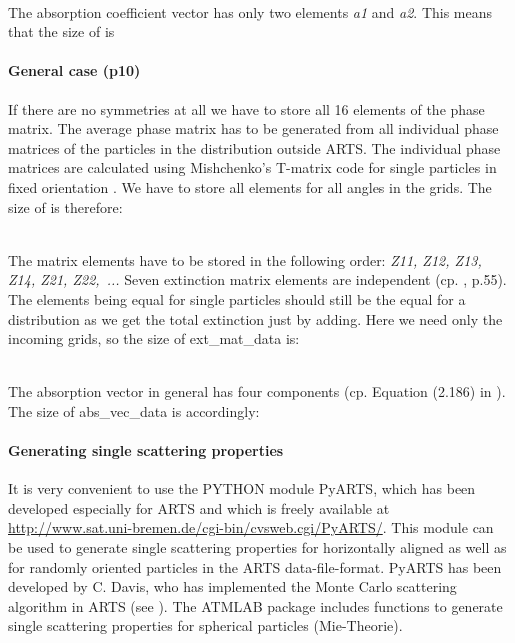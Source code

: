 \artsstyle{[N\_f N\_T N\_za/2+1 1 3]}\\
The absorption coefficient vector has only two elements {\sl a1} and
{\sl a2}. This means that the size of  is 

\artsstyle{[N\_f N\_T N\_za/2+1 1 2]}

\paragraph{General case (p10)}

If there are no symmetries at all we have to store all 16 elements of
the phase matrix. The average phase matrix has to be generated from
all individual phase matrices of the particles in the distribution
outside ARTS. The individual phase matrices are calculated using
Mishchenko's T-matrix code for single particles in fixed orientation
\citep{Mishchenko:00}. 
We have to store all elements for all angles in the grids. The size of
 is therefore: 

\\
The matrix elements have to be stored in the following order: {\sl Z11,
  Z12, Z13, Z14, Z21, Z22,~...} Seven extinction matrix elements are
independent (cp. \citet{Mishchenko:02}, p.55). The elements being equal for
single particles should still be the equal for a distribution as we
get the total extinction just by adding. Here we need only the
incoming grids, so the size of ext\_mat\_data is: 

\\
The absorption vector in general has four components (cp. Equation
(2.186) in \citet{Mishchenko:02}). The size of abs\_vec\_data is
accordingly: 


\paragraph{Generating single scattering properties}
It is very convenient to use the PYTHON module PyARTS, which has been
developed especially for ARTS and which is freely available at
\href{http://www.sat.uni-bremen.de/cgi-bin/cvsweb.cgi/PyARTS/}
{\url{http://www.sat.uni-bremen.de/cgi-bin/cvsweb.cgi/PyARTS/}}. This
module can be used to generate single scattering properties for
horizontally aligned as well as for randomly oriented particles in the
ARTS data-file-format. PyARTS has been developed by C. Davis, who has
implemented the Monte Carlo scattering algorithm in ARTS (see
).
The ATMLAB package includes functions to generate single scattering
properties for spherical particles (Mie-Theorie). 


